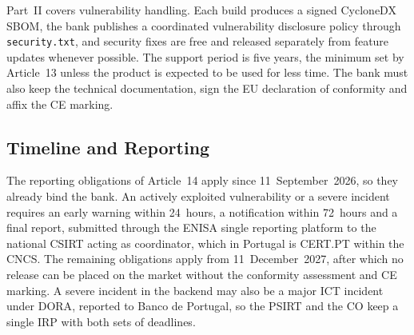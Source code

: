 Part~II covers vulnerability handling. Each build produces a signed
CycloneDX \ac{SBOM}, the bank publishes a coordinated vulnerability
disclosure policy through \texttt{security.txt}, and security fixes are
free and released separately from feature updates whenever possible. The
support period is five years, the minimum set by Article~13 unless the
product is expected to be used for less time. The bank must also keep the technical
documentation, sign the EU declaration of conformity and affix the CE
marking.

\subsection{Timeline and Reporting}
The reporting obligations of Article~14 apply since 11~September~2026, so
they already bind the bank. An actively exploited vulnerability or a
severe incident requires an early warning within 24~hours, a notification
within 72~hours and a final report, submitted through the \ac{ENISA}
single reporting platform to the national \ac{CSIRT} acting as
coordinator, which in Portugal is CERT.PT within the \ac{CNCS}. The
remaining obligations apply from 11~December~2027, after which no release
can be placed on the market without the conformity assessment and CE
marking. A severe incident in the backend may also be a major ICT incident
under \ac{DORA}, reported to Banco de Portugal, so the \ac{PSIRT} and the
CO keep a single \ac{IRP} with both sets of deadlines.
